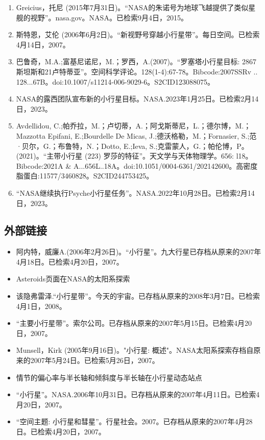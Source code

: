 \begin{enumerate}
\item Greicius，托尼 (2015年7月31日)。“NASA的朱诺号为地球飞越提供了类似星舰的视野”。nasa.gov。NASA。已检索9月4日，2015。
\item 斯特恩，艾伦 (2006年6月2日)。“新视野号穿越小行星带”。每日空间。已检索4月14日，2007。
\item 巴鲁奇，M.A.;富基尼诺尼，M.；罗西，A.(2007)。“罗塞塔小行星目标: 2867斯坦斯和21卢特蒂亚”。空间科学评论。128(1-4):67-78。Bibcode:2007SSRv .. 128...67B。doi:10.1007/s11214-006-9029-6。S2CID123088075。 
\item NASA的露西团队宣布新的小行星目标。NASA.2023年1月25日。已检索2月14日，2023。
\item Avdellidou, C.;帕乔拉，M.；卢切蒂，A.；阿戈斯蒂尼，L.；德尔博，M.；Mazzotta Epifani, E.;Bourdelle De Micas, J.;德沃格勒，M.；Fornasier, S.;范·贝尔，G.；布鲁特，N.；Dotto, E.;Ieva, S.;克雷蒙人，G.；帕伦博，P。(2021)。“主带小行星 (223) 罗莎的特征”。天文学与天体物理学。656: l18。Bibcode:2021A & A...656L..18A。doi:10.1051/0004-6361/202142600。高密度脂蛋白:11577/3460828。S2CID244753425。 
\item “NASA继续执行Psyche小行星任务”。NASA.2022年10月28日。已检索2月14日，2023。
\end{enumerate}
\subsection{外部链接}
\begin{itemize}
\item 阿内特，威廉A.(2006年2月26日)。“小行星”。九大行星已存档从原来的2007年4月18日。已检索4月20日，2007。
\item Asteroids页面在NASA的太阳系探索
\item 该隐弗雷泽.“小行星带”。今天的宇宙。已存档从原来的2008年3月7日。已检索4月1日，2008。
\item “主要小行星带”。索尔公司。已存档从原来的2007年5月15日。已检索4月20日，2007。
\item Munsell，Kirk (2005年9月16日)。"小行星: 概述"。NASA太阳系探索存档自原来的2007年5月24日。已检索5月26日，2007。
\item 情节的偏心率与半长轴和倾斜度与半长轴在小行星动态站点
\item “小行星”。NASA.2006年10月31日。已存档从原来的2007年4月11日。已检索4月20日，2007。
\item “空间主题: 小行星和彗星”。行星社会。2007。已存档从原来的2007年4月28日。已检索4月20日，2007。
\end{itemize}